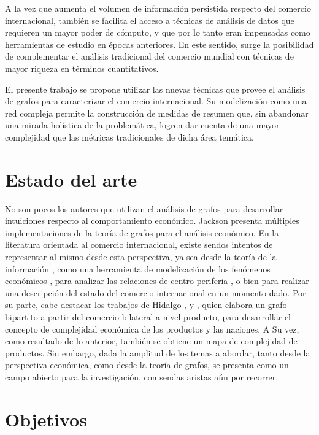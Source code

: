 \documentclass[runningheads,a4paper]{llncs}
\begin{document}
A la vez que aumenta el volumen de información persistida respecto del comercio internacional, también se facilita el acceso a técnicas de análisis de datos que requieren un mayor poder de cómputo, y que por lo tanto eran impensadas como herramientas de estudio en épocas anteriores. En este sentido, surge la posibilidad de complementar el análisis tradicional del comercio mundial con técnicas de mayor riqueza en términos cuantitativos. 

El presente trabajo se propone utilizar las nuevas técnicas que provee el análisis de grafos para caracterizar el comercio internacional. Su modelización como una red compleja permite la construcción de medidas de resumen que, sin abandonar una mirada holística de la problemática, logren dar cuenta de una mayor complejidad que las métricas tradicionales de dicha área temática. 



\section{Estado del arte}

No son pocos los autores que utilizan el análisis de grafos para desarrollar intuiciones respecto al comportamiento económico. Jackson \cite{Jackson2008} presenta múltiples implementaciones de la teoría de grafos para el análisis económico. 
En la literatura orientada al comercio internacional, existe sendos intentos de representar al mismo desde esta perspectiva, ya sea desde la teoría de la información \cite{Bhattacharya2008},  como una herramienta de modelización de los fenómenos económicos \cite{Fan2014}, para analizar las relaciones de centro-periferia \cite{Fagiolo2010}, o bien para realizar una descripción del estado del comercio internacional en un momento dado\cite{Chow2013}.
Por su parte, cabe destacar los trabajos de Hidalgo \cite{Hidalgo2007},\cite{Hidalgo2009a} y \cite{Hidalgo2009}, quien elabora un grafo bipartito a partir del comercio bilateral a nivel producto, para desarrollar el concepto de complejidad económica de los productos y las naciones. A Su vez, como resultado de lo anterior, también se obtiene un mapa de complejidad de productos.
Sin embargo, dada la amplitud de los temas a abordar, tanto desde la perspectiva económica, como desde la teoría de grafos, se presenta como un campo abierto para la investigación, con sendas aristas aún por recorrer.        

\section{Objetivos}
\end{document}
